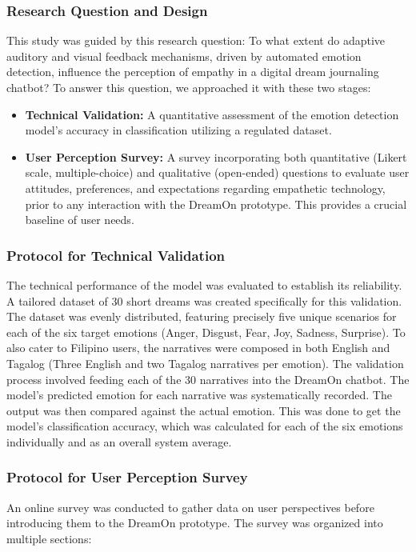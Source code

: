 \documentclass[conference]{IEEEtran}
\begin{document}
	\subsubsection{Research Question and Design}
	This study was guided by this research question: To what extent do adaptive auditory and visual feedback mechanisms, driven by automated emotion detection, influence the perception of empathy in a digital dream journaling chatbot? To answer this question, we approached it with these two stages:
	\begin{itemize}
		\item \textbf{Technical Validation:} A quantitative assessment of the emotion detection model's accuracy in classification utilizing a regulated dataset.
		\item \textbf{User Perception Survey:} A survey incorporating both quantitative (Likert scale, multiple-choice) and qualitative (open-ended) questions to evaluate user attitudes, preferences, and expectations regarding empathetic technology, prior to any interaction with the DreamOn prototype. This provides a crucial baseline of user needs.
	\end{itemize}
	
	\subsubsection{Protocol for Technical Validation}
	The technical performance of the model was evaluated to establish its reliability. A tailored dataset of 30 short dreams was created specifically for this validation. The dataset was evenly distributed, featuring precisely five unique scenarios for each of the six target emotions (Anger, Disgust, Fear, Joy, Sadness, Surprise). To also cater to Filipino users, the narratives were composed in both English and Tagalog (Three English and two Tagalog narratives per emotion).
	The validation process involved feeding each of the 30 narratives into the DreamOn chatbot. The model's predicted emotion for each narrative was systematically recorded. The output was then compared against the actual emotion. This was done to get the model’s classification accuracy, which was calculated for each of the six emotions individually and as an overall system average.
	
	\subsubsection{Protocol for User Perception Survey}
	An online survey was conducted to gather data on user perspectives before introducing them to the DreamOn prototype. The survey was organized into multiple sections:
\end{document}
